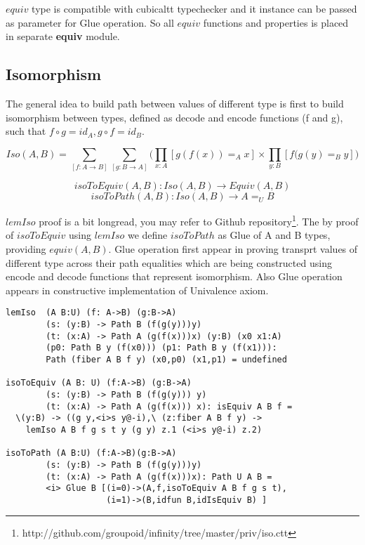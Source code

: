 \documentclass{article}
\begin{document}
$equiv$ type is compatible with cubicaltt typechecker and it instance
can be passed as parameter for Glue operation. So all $equiv$ functions and properties
is placed in separate {\bf equiv} module.

\subsection{Isomorphism}

The general idea to build path between values of different type is first
to build isomorphism between types, defined as decode and encode functions (f and g),
such that $f \circ g = id_A, g \circ f = id_B$.

$$Iso(A,B) = \sum_{[f:A\rightarrow B]}\sum_{[g:B\rightarrow A]}\Biggl( \prod_{x:A} [ g(f(x)) =_A x ] \times \prod_{y:B} [ f(g(y) =_B y ] \Biggr)$$

$$isoToEquiv(A,B) : Iso(A,B) \rightarrow Equiv(A,B)$$
$$isoToPath(A,B) : Iso(A,B) \rightarrow A =_U B$$

$lemIso$ proof is a bit longread, you may refer to Github
repository\footnote{http://github.com/groupoid/infinity/tree/master/priv/iso.ctt}.
The by proof of $isoToEquiv$ using $lemIso$ we define $isoToPath$ as
Glue of A and B types, providing $equiv(A,B)$. Glue operation first appear in
proving transprt values of different type across their path equalities which are being constructed
using encode and decode functions that represent isomorphism. Also Glue operation
appears in constructive implementation of Univalence axiom\cite{Mortberg17}.

\begin{lstlisting}[mathescape=true]
lemIso  (A B:U) (f: A->B) (g:B->A)
        (s: (y:B) -> Path B (f(g(y)))y)
        (t: (x:A) -> Path A (g(f(x)))x) (y:B) (x0 x1:A)
        (p0: Path B y (f(x0))) (p1: Path B y (f(x1))):
        Path (fiber A B f y) (x0,p0) (x1,p1) = undefined

isoToEquiv (A B: U) (f:A->B) (g:B->A)
        (s: (y:B) -> Path B (f(g(y))) y)
        (t: (x:A) -> Path A (g(f(x))) x): isEquiv A B f =
  \(y:B) -> ((g y,<i>s y@-i),\ (z:fiber A B f y) ->
    lemIso A B f g s t y (g y) z.1 (<i>s y@-i) z.2)

isoToPath (A B:U) (f:A->B)(g:B->A)
        (s: (y:B) -> Path B (f(g(y)))y)
        (t: (x:A) -> Path A (g(f(x)))x): Path U A B =
        <i> Glue B [(i=0)->(A,f,isoToEquiv A B f g s t),
                    (i=1)->(B,idfun B,idIsEquiv B) ]
\end{lstlisting}
\end{document}

